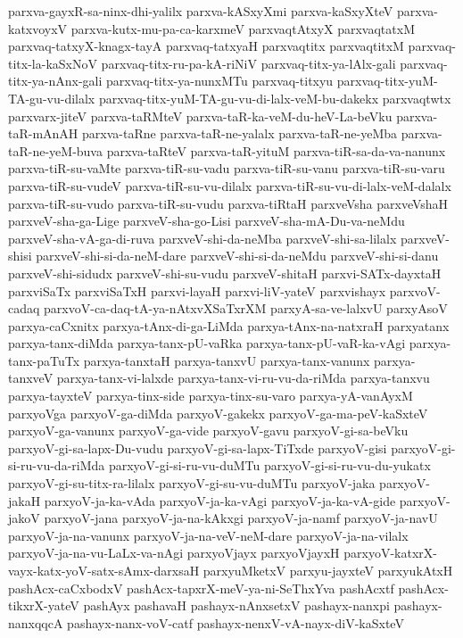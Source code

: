 {parxva-gayxR-sa-ninx-dhi-yalilx
parxva-kASxyXmi
parxva-kaSxyXteV
parxva-katxvoyxV
parxva-kutx-mu-pa-ca-karxmeV
parxvaqtAtxyX
parxvaqtatxM
parxvaq-tatxyX-knagx-tayA
parxvaq-tatxyaH
parxvaqtitx
parxvaqtitxM
parxvaq-titx-la-kaSxNoV
parxvaq-titx-ru-pa-kA-riNiV
parxvaq-titx-ya-lAlx-gali
parxvaq-titx-ya-nAnx-gali
parxvaq-titx-ya-nunxMTu
parxvaq-titxyu
parxvaq-titx-yuM-TA-gu-vu-dilalx
parxvaq-titx-yuM-TA-gu-vu-di-lalx-veM-bu-dakekx
parxvaqtwtx
parxvarx-jiteV
parxva-taRMteV
parxva-taR-ka-veM-du-heV-La-beVku
parxva-taR-mAnAH
parxva-taRne
parxva-taR-ne-yalalx
parxva-taR-ne-yeMba
parxva-taR-ne-yeM-buva
parxva-taRteV
parxva-taR-yituM
parxva-tiR-sa-da-va-nanunx
parxva-tiR-su-vaMte
parxva-tiR-su-vadu
parxva-tiR-su-vanu
parxva-tiR-su-varu
parxva-tiR-su-vudeV
parxva-tiR-su-vu-dilalx
parxva-tiR-su-vu-di-lalx-veM-dalalx
parxva-tiR-su-vudo
parxva-tiR-su-vudu
parxva-tiRtaH
parxveVsha
parxveVshaH
parxveV-sha-ga-Lige
parxveV-sha-go-Lisi
parxveV-sha-mA-Du-va-neMdu
parxveV-sha-vA-ga-di-ruva
parxveV-shi-da-neMba
parxveV-shi-sa-lilalx
parxveV-shisi
parxveV-shi-si-da-neM-dare
parxveV-shi-si-da-neMdu
parxveV-shi-si-danu
parxveV-shi-sidudx
parxveV-shi-su-vudu
parxveV-shitaH
parxvi-SATx-dayxtaH
parxviSaTx
parxviSaTxH
parxvi-layaH
parxvi-liV-yateV
parxvishayx
parxvoV-cadaq
parxvoV-ca-daq-tA-ya-nAtxvXSaTxrXM
parxyA-sa-ve-lalxvU
parxyAsoV
parxya-caCxnitx
parxya-tAnx-di-ga-LiMda
parxya-tAnx-na-natxraH
parxyatanx
parxya-tanx-diMda
parxya-tanx-pU-vaRka
parxya-tanx-pU-vaR-ka-vAgi
parxya-tanx-paTuTx
parxya-tanxtaH
parxya-tanxvU
parxya-tanx-vanunx
parxya-tanxveV
parxya-tanx-vi-lalxde
parxya-tanx-vi-ru-vu-da-riMda
parxya-tanxvu
parxya-tayxteV
parxya-tinx-side
parxya-tinx-su-varo
parxya-yA-vanAyxM
parxyoVga
parxyoV-ga-diMda
parxyoV-gakekx
parxyoV-ga-ma-peV-kaSxteV
parxyoV-ga-vanunx
parxyoV-ga-vide
parxyoV-gavu
parxyoV-gi-sa-beVku
parxyoV-gi-sa-lapx-Du-vudu
parxyoV-gi-sa-lapx-TiTxde
parxyoV-gisi
parxyoV-gi-si-ru-vu-da-riMda
parxyoV-gi-si-ru-vu-duMTu
parxyoV-gi-si-ru-vu-du-yukatx
parxyoV-gi-su-titx-ra-lilalx
parxyoV-gi-su-vu-duMTu
parxyoV-jaka
parxyoV-jakaH
parxyoV-ja-ka-vAda
parxyoV-ja-ka-vAgi
parxyoV-ja-ka-vA-gide
parxyoV-jakoV
parxyoV-jana
parxyoV-ja-na-kAkxgi
parxyoV-ja-namf
parxyoV-ja-navU
parxyoV-ja-na-vanunx
parxyoV-ja-na-veV-neM-dare
parxyoV-ja-na-vilalx
parxyoV-ja-na-vu-LaLx-va-nAgi
parxyoVjayx
parxyoVjayxH
parxyoV-katxrX-vayx-katx-yoV-satx-sAmx-darxsaH
parxyuMketxV
parxyu-jayxteV
parxyukAtxH
pashAcx-caCxbodxV
pashAcx-tapxrX-meV-ya-ni-SeThxYva
pashAcxtf
pashAcx-tikxrX-yateV
pashAyx
pashavaH
pashayx-nAnxsetxV
pashayx-nanxpi
pashayx-nanxqqcA
pashayx-nanx-voV-catf
pashayx-nenxV-vA-nayx-diV-kaSxteV
}
